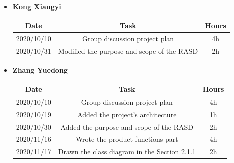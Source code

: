 \documentclass[a4paper,12pt]{book}
\begin{document}
\begin{itemize}
	\item \textbf{Kong Xiangyi}
	\begin{center}
		\begin{tabular}{ |c|c|c| } 
			\hline
			Date & Task & Hours \\
			\hline
			\hline
			2020/10/10 & Group discussion project plan & 4h \\ 
			\hline
			2020/10/31 & Modified the purpose and scope of the RASD & 2h \\ 
			\hline
		\end{tabular}
	\end{center}
	\item \textbf{Zhang Yuedong}
	\begin{center}
		\begin{tabular}{ |c|c|c| } 
			\hline
			Date & Task & Hours \\
			\hline
			\hline
			2020/10/10 & Group discussion project plan & 4h \\ 
			\hline
			2020/10/19 & Added the project's architecture & 1h \\ 
			\hline
			2020/10/30 & Added the purpose and scope of the RASD & 2h \\ 
			\hline
			2020/11/16 & Wrote the product functions part & 4h \\ 
			\hline
			2020/11/17 & Drawn the class diagram in the Section 2.1.1  & 2h \\ 
			\hline
		\end{tabular}
	\end{center}
\end{itemize}


\backmatter
\end{document}
